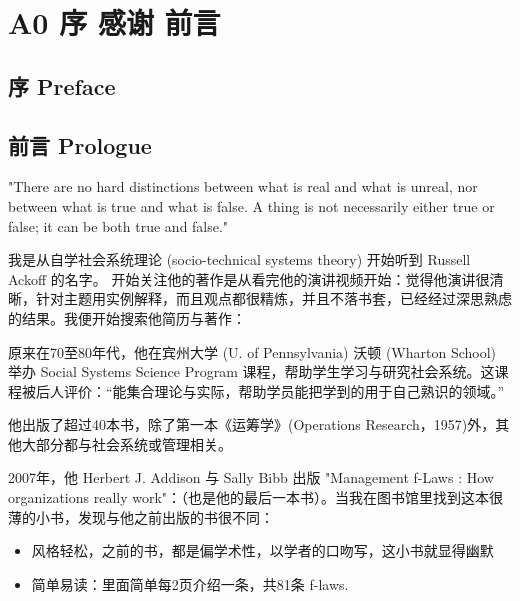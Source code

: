 \chapter{A0 序 感谢 前言} %

\hypertarget{ux5e8f-preface}{%
\section{序 Preface}\label{ux5e8f-preface}}

\hypertarget{ux524dux8a00-prologue}{%
\section{前言 Prologue}\label{ux524dux8a00-prologue}}

"There are no hard distinctions between what is real and what is unreal,
nor between what is true and what is false. A thing is not necessarily
either true or false; it can be both true and false."

\begin{description}
\item[]
\end{description}

我是从自学社会系统理论 (socio-technical systems theory) 开始听到 Russell
Ackoff 的名字。
开始关注他的著作是从看完他的演讲视频开始：觉得他演讲很清晰，针对主题用实例解释，而且观点都很精炼，并且不落书套，已经经过深思熟虑的结果。我便开始搜索他简历与著作：

原来在70至80年代，他在宾州大学 (U. of Pennsylvania) 沃顿 (Wharton
School) 举办 Social Systems Science Program
课程，帮助学生学习与研究社会系统。这课程被后人评价：``能集合理论与实际，帮助学员能把学到的用于自己熟识的领域。''

他出版了超过40本书，除了第一本《运筹学》(Operations
Research，1957)外，其他大部分都与社会系统或管理相关。

2007年，他 Herbert J. Addison 与 Sally Bibb 出版 "Management f-Laws :
How organizations really
work"：（也是他的最后一本书）。当我在图书馆里找到这本很薄的小书，发现与他之前出版的书很不同：

\begin{itemize}
\tightlist
\item
  风格轻松，之前的书，都是偏学术性，以学者的口吻写，这小书就显得幽默
\item
  简单易读：里面简单每2页介绍一条，共81条 f-laws.
\end{itemize}

